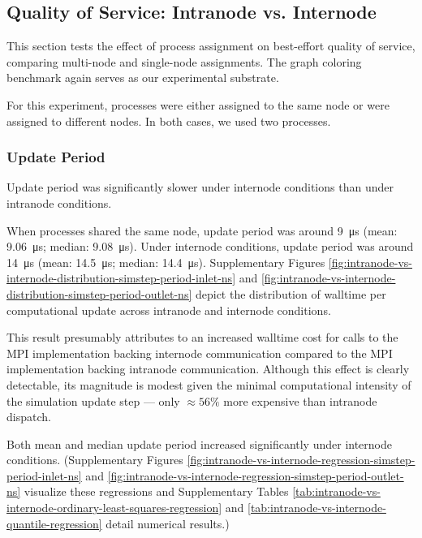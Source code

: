 \subsection{Quality of Service: Intranode vs. Internode}
\label{sec:intranode-vs-internode}

This section tests the effect of process assignment on best-effort quality of service, comparing multi-node and single-node assignments.
The graph coloring benchmark again serves as our experimental substrate.

For this experiment, processes were either assigned to the same node or were assigned to different nodes.
In both cases, we used two processes.

\subsubsection{Update Period}

Update period was significantly slower under internode conditions than under intranode conditions.

When processes shared the same node, update period was around \SI{9}{\micro\second} (mean: \SI{9.06}{\micro\second}; median: \SI{9.08}{\micro\second}).
Under internode conditions, update period was around \SI{14}{\micro\second} (mean: \SI{14.5}{\micro\second}; median: \SI{14.4}{\micro\second}).
Supplementary Figures \ref{fig:intranode-vs-internode-distribution-simstep-period-inlet-ns} and \ref{fig:intranode-vs-internode-distribution-simstep-period-outlet-ns} depict the distribution of walltime per computational update across intranode and internode conditions.

This result presumably attributes to an increased walltime cost for calls to the MPI implementation backing internode communication compared to the MPI implementation backing intranode communication.
Although this effect is clearly detectable, its magnitude is modest given the minimal computational intensity of the simulation update step --- only $\approx 56\%$ more expensive than intranode dispatch.

Both mean and median update period increased significantly under internode conditions.
(Supplementary Figures \ref{fig:intranode-vs-internode-regression-simstep-period-inlet-ns} and \ref{fig:intranode-vs-internode-regression-simstep-period-outlet-ns} visualize these regressions and Supplementary Tables \ref{tab:intranode-vs-internode-ordinary-least-squares-regression} and \ref{tab:intranode-vs-internode-quantile-regression} detail numerical results.)

